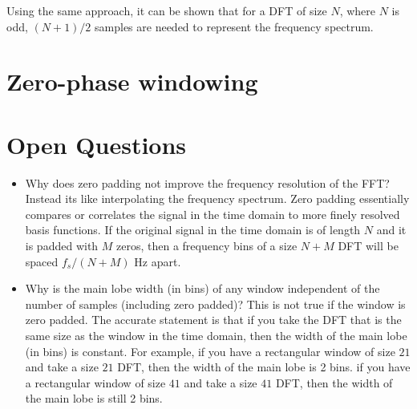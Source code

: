 \documentclass{article}
\begin{document}
	Using the same approach, it can be shown that for a DFT of size $N$, where $N$ is odd, $(N+1)/2$ samples are needed to represent the frequency spectrum.
	
	\section{Zero-phase windowing}
	
	\section{Open Questions}
	
	\begin{itemize}
		\item Why does zero padding not improve the frequency resolution of the FFT? Instead its like interpolating the frequency spectrum. Zero padding essentially compares or correlates the signal in the time domain to more finely resolved basis functions. If the original signal in the time domain is of length $N$ and it is padded with $M$ zeros, then a frequency bins of a size $N+M$ DFT will be spaced $f_s/(N+M)$ Hz apart.
		\item Why is the main lobe width (in bins) of any window independent of the number of samples (including zero padded)? This is not true if the window is zero padded. The accurate statement is that if you take the DFT that is the same size as the window in the time domain, then the width of the main lobe (in bins) is constant. For example, if you have a rectangular window of size $21$ and take a size $21$ DFT, then the width of the main lobe is 2 bins. if you have a rectangular window of size $41$ and take a size $41$ DFT, then the width of the main lobe is still 2 bins.
	\end{itemize}
\end{document}
